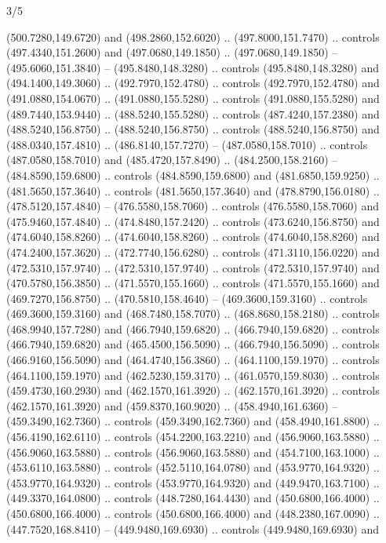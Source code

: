 \begin{flagdescription}{3/5}
\begin{scope}[shift={(0.5\flaglength,0.5\flagwidth)},scale=\flagwidth/510]
\begin{scope}[y=0.80pt, x=0.80pt, yscale=-1.06, xscale=1.06,yshift=-240pt,xshift=-400pt]
\begin{scope}[cm={{0.83333,0.0,0.0,0.83333,(154.64672,48.64761)}}]
\begin{scope}[cm={{0.93334,0.0,0.0,0.93334,(-4.86471,22.64035)}}]
\begin{scope}[line width=0.489\lw]
\begin{scope}[draw=c003300,fill=c338a00]
  (500.7280,149.6720) and (498.2860,152.6020) .. (497.8000,151.7470) .. controls
  (497.4340,151.2600) and (497.0680,149.1850) .. (497.0680,149.1850) --
  (495.6060,151.3840) -- (495.8480,148.3280) .. controls (495.8480,148.3280) and
  (494.1400,149.3060) .. (492.7970,152.4780) .. controls (492.7970,152.4780) and
  (491.0880,154.0670) .. (491.0880,155.5280) .. controls (491.0880,155.5280) and
  (489.7440,153.9440) .. (488.5240,155.5280) .. controls (487.4240,157.2380) and
  (488.5240,156.8750) .. (488.5240,156.8750) .. controls (488.5240,156.8750) and
  (488.0340,157.4810) .. (486.8140,157.7270) -- (487.0580,158.7010) .. controls
  (487.0580,158.7010) and (485.4720,157.8490) .. (484.2500,158.2160) --
  (484.8590,159.6800) .. controls (484.8590,159.6800) and (481.6850,159.9250) ..
  (481.5650,157.3640) .. controls (481.5650,157.3640) and (478.8790,156.0180) ..
  (478.5120,157.4840) -- (476.5580,158.7060) .. controls (476.5580,158.7060) and
  (475.9460,157.4840) .. (474.8480,157.2420) .. controls (473.6240,156.8750) and
  (474.6040,158.8260) .. (474.6040,158.8260) .. controls (474.6040,158.8260) and
  (474.2400,157.3620) .. (472.7740,156.6280) .. controls (471.3110,156.0220) and
  (472.5310,157.9740) .. (472.5310,157.9740) .. controls (472.5310,157.9740) and
  (470.5780,156.3850) .. (471.5570,155.1660) .. controls (471.5570,155.1660) and
  (469.7270,156.8750) .. (470.5810,158.4640) -- (469.3600,159.3160) .. controls
  (469.3600,159.3160) and (468.7480,158.7070) .. (468.8680,158.2180) .. controls
  (468.9940,157.7280) and (466.7940,159.6820) .. (466.7940,159.6820) .. controls
  (466.7940,159.6820) and (465.4500,156.5090) .. (466.7940,156.5090) .. controls
  (466.9160,156.5090) and (464.4740,156.3860) .. (464.1100,159.1970) .. controls
  (464.1100,159.1970) and (462.5230,159.3170) .. (461.0570,159.8030) .. controls
  (459.4730,160.2930) and (462.1570,161.3920) .. (462.1570,161.3920) .. controls
  (462.1570,161.3920) and (459.8370,160.9020) .. (458.4940,161.6360) --
  (459.3490,162.7360) .. controls (459.3490,162.7360) and (458.4940,161.8800) ..
  (456.4190,162.6110) .. controls (454.2200,163.2210) and (456.9060,163.5880) ..
  (456.9060,163.5880) .. controls (456.9060,163.5880) and (454.7100,163.1000) ..
  (453.6110,163.5880) .. controls (452.5110,164.0780) and (453.9770,164.9320) ..
  (453.9770,164.9320) .. controls (453.9770,164.9320) and (449.9470,163.7100) ..
  (449.3370,164.0800) .. controls (448.7280,164.4430) and (450.6800,166.4000) ..
  (450.6800,166.4000) .. controls (450.6800,166.4000) and (448.2380,167.0090) ..
  (447.7520,168.8410) -- (449.9480,169.6930) .. controls (449.9480,169.6930) and

\end{scope}
\end{scope}
\end{scope}
\end{scope}
\end{scope}
\end{scope}
\end{flagdescription}
